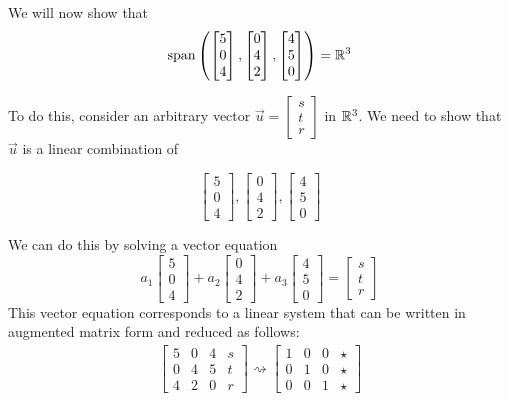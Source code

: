 \documentclass{ximera}
\begin{document}
\begin{example}
\begin{explanation}
We will now show that 
$$\textnormal{span}\left(\begin{bmatrix}5\\0\\4\end{bmatrix}, \begin{bmatrix}0\\4\\2\end{bmatrix},\begin{bmatrix}4\\5\\0\end{bmatrix}\right)=\mathbb{R}^3$$

To do this, consider an arbitrary vector $\vec{u}=\begin{bmatrix}s\\t\\r\end{bmatrix}$ in $\mathbb{R}^3$.  We need to show that $\vec{u}$ is a linear combination of 

$$\begin{bmatrix}5\\0\\4\end{bmatrix}, \begin{bmatrix}0\\4\\2\end{bmatrix},\begin{bmatrix}4\\5\\0\end{bmatrix}$$

We can do this by solving a vector equation
$$a_1\begin{bmatrix}5\\0\\4\end{bmatrix}+ a_2\begin{bmatrix}0\\4\\2\end{bmatrix}+a_3\begin{bmatrix}4\\5\\0\end{bmatrix}=\begin{bmatrix}s\\t\\r\end{bmatrix}$$
This vector equation corresponds to a linear system that can be written in augmented matrix form and reduced as follows:
\begin{align}\label{eq:gjreductionspan}\left[\begin{array}{ccc|c}  
 5&0&4&s\\0&4&5&t\\4&2&0&r
 \end{array}\right]\rightsquigarrow\left[\begin{array}{ccc|c}  
 1&0&0&\star\\0&1&0&\star\\0&0&1&\star
 \end{array}\right]\end{align}
 

\end{explanation}
\end{example}
\end{document}
